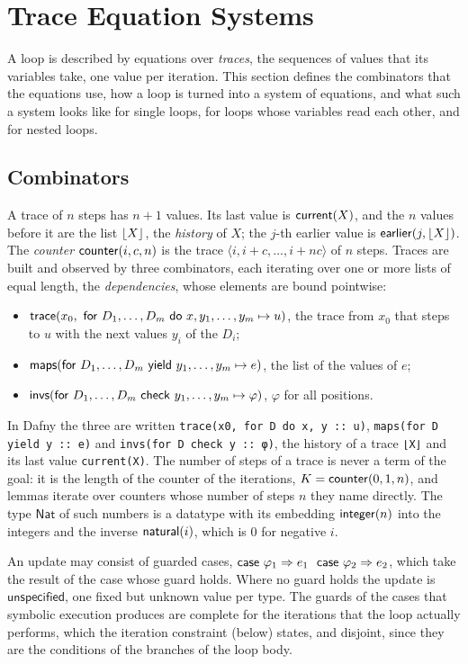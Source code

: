 \section{Trace Equation Systems}\label{sec:teq}

A loop is described by equations over \emph{traces}, the sequences of values that its variables take, one
value per iteration. This section defines the combinators that the equations use, how a loop is turned into
a system of equations, and what such a system looks like for single loops, for loops whose variables read
each other, and for nested loops.

\subsection{Combinators}
A trace of $n$ steps has $n + 1$ values. Its last value is $\mathsf{current}(X)$, and the $n$ values before it are the
list $\lfloor X\rfloor$, the \emph{history} of $X$; the $j$-th earlier value is $\mathsf{earlier}(j, \lfloor X\rfloor)$. The
\emph{counter} $\mathsf{counter}(i, c, n)$ is the trace $\langle i, i + c, \ldots, i + nc\rangle$ of $n$ steps. Traces
are built and observed by three combinators, each iterating over one or more lists of equal length, the
\emph{dependencies}, whose elements are bound pointwise:
\begin{itemize}[nosep]
\item $\mathsf{trace}(x_0,\ \mathsf{for}\ D_1, \ldots, D_m\ \mathsf{do}\ x, y_1, \ldots, y_m \mapsto u)$, the trace from $x_0$ that steps to $u$ with the
  next values $y_i$ of the $D_i$;
\item $\mathsf{maps}(\mathsf{for}\ D_1, \ldots, D_m\ \mathsf{yield}\ y_1, \ldots, y_m \mapsto e)$, the list of the values of $e$;
\item $\mathsf{invs}(\mathsf{for}\ D_1, \ldots, D_m\ \mathsf{check}\ y_1, \ldots, y_m \mapsto \varphi)$, $\varphi$ for all positions.
\end{itemize}
In Dafny the three are written \texttt{trace(x0, for D do x, y :: u)}, \texttt{maps(for D yield y :: e)} and
\texttt{invs(for D check y :: φ)}, the history of a trace \texttt{⌊X⌋} and its last value
\texttt{current(X)}. The number of steps of a trace is never a term of the goal: it is the length of the
counter of the iterations, $K = \mathsf{counter}(0, 1, n)$, and lemmas iterate over counters whose number of steps $n$
they name directly. The type $\mathsf{Nat}$ of such numbers is a datatype with its embedding
$\mathsf{integer}(n)$ into the integers and the inverse $\mathsf{natural}(i)$, which is $0$ for negative $i$.

An update may consist of guarded cases, $\upd{\varphi_1}{e_1}\ \ \upd{\varphi_2}{e_2}$, which take the
result of the case whose guard holds. Where no guard holds the update is $\mathsf{unspecified}$, one
fixed but unknown value per type. The guards of the cases that symbolic execution produces are complete
for the iterations that the loop actually performs, which the iteration constraint (below) states, and
disjoint, since they are the conditions of the branches of the loop body.

